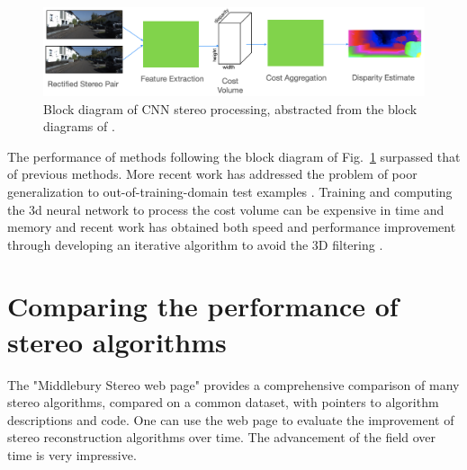 \begin{figure}
    \centerline{
        \includegraphics[width=0.8\linewidth]{figures/stereo/stereocnn.jpg}
    }
    \caption{Block diagram of CNN stereo processing, abstracted from the block diagrams of \cite{Chang2018,Zhang2019GANet,Kendall2017}.}
    \label{fig:stereoblock}
\end{figure}

The performance of methods following the block diagram of Fig.~\ref{fig:stereoblock} surpassed that of previous methods.  More recent work has addressed the problem of poor generalization to out-of-training-domain test examples \cite{zhang2019domaininvariant}.  Training and computing the 3d neural network to process the cost volume can be expensive in time and memory and recent work has obtained both speed and performance improvement through developing an iterative algorithm to avoid the 3D filtering \cite{Lipson2021}.


\section{Comparing the performance of stereo algorithms}
The "Middlebury Stereo web page" \cite{Scharstein2002} provides a comprehensive comparison of many stereo algorithms, compared on a common dataset, with pointers to algorithm descriptions and code.  One can use the web page to evaluate the improvement of stereo reconstruction algorithms over time.  The advancement of the field over time is very impressive.


